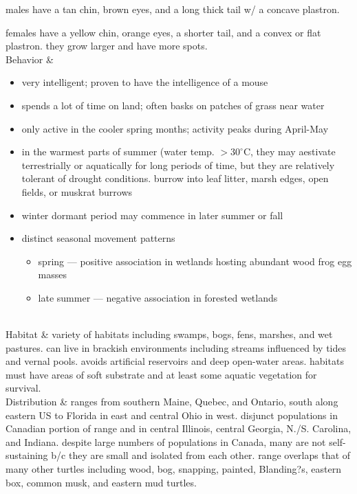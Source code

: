 \begin{center}
\begin{longtabu}
	males have a tan chin, brown eyes, and a long thick tail w/ a concave plastron.
	
	females have a yellow chin, orange eyes, a shorter tail, and a convex or flat plastron. they grow larger and have more spots.
	\\
	\hline
	Behavior & 
	\begin{itemize}[noitemsep]
		\item very intelligent; proven to have the intelligence of a mouse
		\item spends a lot of time on land; often basks on patches of grass near water
		\item only active in the cooler spring months; activity peaks during April-May
		\item in the warmest parts of summer (water temp. $> 30^\circ$C, they may aestivate terrestrially or aquatically for long periods of time, but they are relatively tolerant of drought conditions. burrow into leaf litter, marsh edges, open fields, or muskrat burrows
		\item winter dormant period may commence in later summer or fall
		\item distinct seasonal movement patterns
			\begin{itemize}[noitemsep]
				\item spring --- positive association in wetlands hosting abundant wood frog egg masses 
				\item late summer --- negative association in forested wetlands
			\end{itemize}
	\end{itemize}
	\\
	\hline
	Habitat & 
	variety of habitats including swamps, bogs, fens, marshes,  and wet pastures. can live in brackish environments including streams influenced by tides and vernal pools. avoids artificial reservoirs and deep open-water areas. habitats must have areas of soft substrate and at least some aquatic vegetation for survival.
	\\
	\hline
	Distribution & 
	ranges from southern Maine, Quebec, and Ontario, south along eastern US to Florida in east and central Ohio in west. disjunct populations in Canadian portion of range and in central Illinois, central Georgia, N./S. Carolina, and Indiana. despite large numbers of populations in Canada, many are not self-sustaining b/c they are small and isolated from each other. range overlaps that of many other turtles including wood, bog, snapping, painted, Blanding?s, eastern box, common musk, and eastern mud turtles.
	

\end{longtabu}
\end{center}
